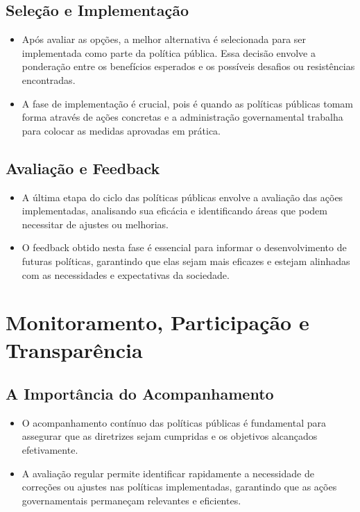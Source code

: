 \documentclass[
   article,       
   12pt,          
   oneside,       
   a4paper,       
   english,       
   brazil,        
   sumario=tradicional
   ]{abntex2}
\begin{document}
\subsection{Seleção e Implementação}
\begin{itemize}
    \item Após avaliar as opções, a melhor alternativa é selecionada para ser implementada como parte da política pública. Essa decisão envolve a ponderação entre os benefícios esperados e os possíveis desafios ou resistências encontradas.
    \item A fase de implementação é crucial, pois é quando as políticas públicas tomam forma através de ações concretas e a administração governamental trabalha para colocar as medidas aprovadas em prática.
\end{itemize}

\subsection{Avaliação e Feedback}
\begin{itemize}
    \item A última etapa do ciclo das políticas públicas envolve a avaliação das ações implementadas, analisando sua eficácia e identificando áreas que podem necessitar de ajustes ou melhorias.
    \item O feedback obtido nesta fase é essencial para informar o desenvolvimento de futuras políticas, garantindo que elas sejam mais eficazes e estejam alinhadas com as necessidades e expectativas da sociedade.
\end{itemize}

\section{Monitoramento, Participação e Transparência}
\subsection{A Importância do Acompanhamento}
\begin{itemize}
    \item O acompanhamento contínuo das políticas públicas é fundamental para assegurar que as diretrizes sejam cumpridas e os objetivos alcançados efetivamente.
    \item A avaliação regular permite identificar rapidamente a necessidade de correções ou ajustes nas políticas implementadas, garantindo que as ações governamentais permaneçam relevantes e eficientes.
\end{itemize}
\end{document}
